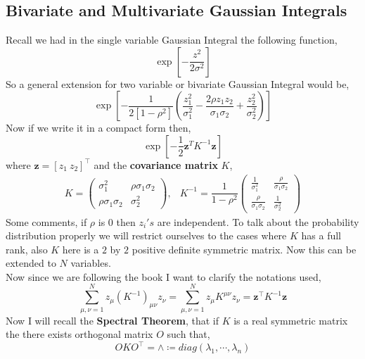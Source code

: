 \documentclass{scrartcl} %
\numberwithin{equation}{subsection}  %
\begin{document}
\subsection{Bivariate and Multivariate Gaussian Integrals}
Recall we had in the single variable Gaussian Integral the following function,
\begin{equation}
	\exp\left[-\frac{z^2}{2\sigma^2}\right]
\end{equation}
So a general extension for two variable or bivariate Gaussian Integral would be,
\begin{equation}
	\exp\left[-\frac{1}{2[1 - \rho^2]}\left(\frac{z_1^2}{\sigma_1^2} - \frac{2\rho z_1z_2}{\sigma_1\sigma_2} +
	\frac{z_2^2}{\sigma_2^2}\right)\right]
\end{equation}
Now if we write it in a compact form then,
\begin{equation}
	\exp\left[-\frac{1}{2}\textbf{z}^TK^{-1}\textbf{z}\right]
\end{equation}
where $\textbf{z} = [z_1 \ z_2]^\top$ and the \textbf{covariance matrix} $K$,
\[
\begin{array}{ll}
	K = \begin{pmatrix}
		\sigma_1^2 & \rho\sigma_1\sigma_2 \\
		\rho\sigma_1\sigma_2 & \sigma_2^2 
	\end{pmatrix}, & 
	K^{-1} = \dfrac{1}{1 - \rho^2}\begin{pmatrix}
		\frac{1}{\sigma_1^2} & \frac{\rho}{\sigma_1 \sigma_2} \\
		\frac{\rho}{\sigma_1 \sigma_2} & \frac{1}{\sigma_2^2}
	\end{pmatrix}
\end{array}
\]
Some comments, if $\rho$ is $0$ then $z_i's$ are independent. To talk about the probability distribution properly
we will restrict ourselves to the cases where $K$ has a full rank, also $K$ here is a $2$ by $2$ positive definite 
symmetric matrix.
Now this can be extended to $N$ variables.\\
Now since we are following the book I want to clarify the notations used,
\begin{equation}
	\sum\limits_{\mu,\nu = 1}^N z_{\mu} (K^{-1})_{\mu \nu}z_{\nu} = 
	\sum\limits_{\mu,\nu = 1}^N z_{\mu} K^{\mu\nu}z_{\nu} = \textbf{z}^\top K^{-1}\textbf{z}
\end{equation}
Now I will recall the \textbf{Spectral Theorem}, that if $K$ is a real symmetric matrix the there exists
orthogonal matrix $O$ such that,
\begin{equation}
	OKO^\top = \boldsymbol{\land} \coloneqq diag(\lambda_1,\cdots,\lambda_n)
\end{equation}
\end{document}
